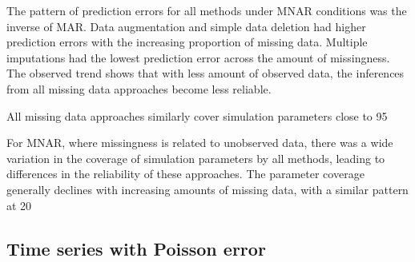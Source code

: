 The pattern of prediction errors for all methods under MNAR conditions was the inverse of MAR. Data augmentation and simple data deletion had higher prediction errors with the increasing proportion of missing data. Multiple imputations had the lowest prediction error across the amount of missingness. The observed trend shows that with less amount of observed data, the inferences from all missing data approaches become less reliable. 

All missing data approaches similarly cover simulation parameters close to 95%

For MNAR, where missingness is related to unobserved data, there was a wide variation in the coverage of simulation parameters by all methods, leading to differences in the reliability of these approaches. The parameter coverage generally declines with increasing amounts of missing data, with a similar pattern at 20%


\subsection*{Time series with Poisson error}

